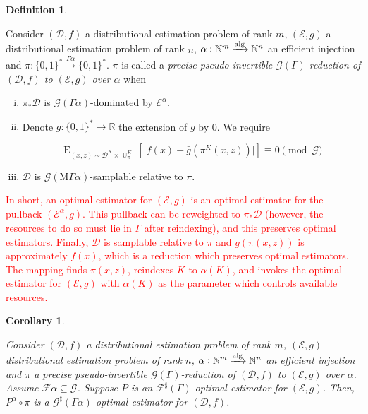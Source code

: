\documentclass[11pt]{article}
\numberwithin{equation}{section}
\theoremstyle{definition}
\newtheorem{definition}{Definition}[section]
\theoremstyle{plain}
\newtheorem{corollary}{Corollary}[section]
\newcommand{\Bool}{\{0,1\}}
\newcommand{\Words}{{\Bool^*}}
\DeclareMathOperator{\E}{E}
\DeclareMathOperator{\Un}{U}
\newcommand{\Nats}{\mathbb{N}}
\newcommand{\Reals}{\mathbb{R}}
\newcommand{\Abs}[1]{\lvert #1 \rvert}
\newcommand{\Dist}{\mathcal{D}}
\newcommand{\MGrow}{\mathrm{M}\Gamma}
\newcommand{\Fall}{\mathcal{F}}
\newcommand{\ESG}{\Fall^\sharp(\Gamma)}
\newcommand{\Alg}{\xrightarrow{\textnormal{alg}}}
\begin{document}
\begin{samepage}
\begin{definition}
\label{def:pp_reduce}

Consider $(\Dist,f)$ a distributional estimation problem of rank ${m}$, $(\mathcal{E},g)$ a distributional estimation problem of rank ${n}$, ${\alpha: \Nats^m \Alg \Nats^n}$ an efficient injection and ${\pi: \Words \xrightarrow{\Gamma \alpha} \Words}$. $\pi$ is called a \emph{precise pseudo-invertible $\mathcal{G}(\Gamma)$-reduction of $(\Dist,f)$ to $(\mathcal{E},g)$ over ${\alpha}$} when

\begin{enumerate}[(i)]

\item\label{con:def__pp_reduce__dist} ${\pi_*\Dist}$ is ${\mathcal{G}(\Gamma \alpha)}$-dominated by ${\mathcal{E}^\alpha}$.

\item\label{con:def__pp_reduce__fun} Denote ${\bar{g}: \Words \rightarrow \Reals}$ the extension of $g$ by 0. We require

\[\E_{(x,z) \sim \Dist^{K} \times \Un_\pi^{K}}[\Abs{f(x)-\bar{g}(\pi^{K}(x,z))}] \equiv 0 \pmod {\mathcal{G}}\]

\item\label{con:def__pp_reduce__smp} $\Dist$ is $\mathcal{G}(\MGrow \alpha)$-samplable relative to $\pi$.

\end{enumerate}

\end{definition}
\end{samepage}

\begin{samepage}

\textcolor{red}{In short, an optimal estimator for $(\mathcal{E},g)$ is an optimal estimator for the pullback $(\mathcal{E}^{\alpha},g)$. This pullback can be reweighted to $\pi_{*}\Dist$ (however, the resources to do so must lie in $\Gamma$ after reindexing), and this preserves optimal estimators. Finally, $\Dist$ is samplable relative to $\pi$ and $g(\pi(x,z))$ is approximately $f(x)$, which is a reduction which preserves optimal estimators. The mapping finds $\pi(x,z)$, reindexes $K$ to $\alpha(K)$, and invokes the optimal estimator for $(\mathcal{E},g)$ with $\alpha(K)$ as the parameter which controls available resources.}

\begin{corollary}
\label{crl:pp_reduce_sharp}

Consider $(\Dist,f)$ a distributional estimation problem of rank ${m}$, $(\mathcal{E},g)$ distributional estimation problem of rank ${n}$, ${\alpha: \Nats^m \Alg \Nats^n}$ an efficient injection and $\pi$ a precise pseudo-invertible $\mathcal{G}(\Gamma)$-reduction of $(\Dist, f)$ to $(\mathcal{E}, g)$ over ${\alpha}$. Assume ${\Fall\alpha \subseteq \mathcal{G}}$. Suppose $P$ is an $\ESG$-optimal estimator for $(\mathcal{E}, g)$. Then, $P^\alpha \circ \pi$ is a $\mathcal{G}^\sharp (\Gamma \alpha)$-optimal estimator for $(\Dist, f)$.

\end{corollary}
\end{samepage}
\end{document}
